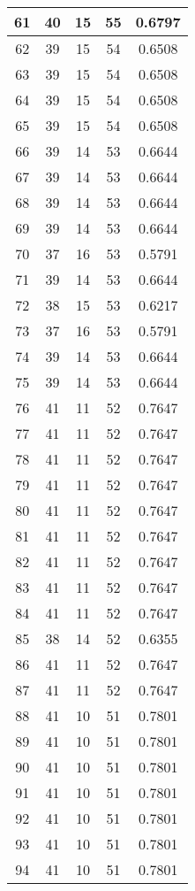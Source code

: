\documentclass[letterpaper, 12pt]{article}
\begin{document}
\begin{longtable}{|c|c|c|c|c|}
61 & 40 & 15 & 55 & 0.6797 \\
\hline
62 & 39 & 15 & 54 & 0.6508 \\
\hline
63 & 39 & 15 & 54 & 0.6508 \\
\hline
64 & 39 & 15 & 54 & 0.6508 \\
\hline
65 & 39 & 15 & 54 & 0.6508 \\
\hline
66 & 39 & 14 & 53 & 0.6644 \\
\hline
67 & 39 & 14 & 53 & 0.6644 \\
\hline
68 & 39 & 14 & 53 & 0.6644 \\
\hline
69 & 39 & 14 & 53 & 0.6644 \\
\hline
70 & 37 & 16 & 53 & 0.5791 \\
\hline
71 & 39 & 14 & 53 & 0.6644 \\
\hline
72 & 38 & 15 & 53 & 0.6217 \\
\hline
73 & 37 & 16 & 53 & 0.5791 \\
\hline
74 & 39 & 14 & 53 & 0.6644 \\
\hline
75 & 39 & 14 & 53 & 0.6644 \\
\hline
76 & 41 & 11 & 52 & 0.7647 \\
\hline
77 & 41 & 11 & 52 & 0.7647 \\
\hline
78 & 41 & 11 & 52 & 0.7647 \\
\hline
79 & 41 & 11 & 52 & 0.7647 \\
\hline
80 & 41 & 11 & 52 & 0.7647 \\
\hline
81 & 41 & 11 & 52 & 0.7647 \\
\hline
82 & 41 & 11 & 52 & 0.7647 \\
\hline
83 & 41 & 11 & 52 & 0.7647 \\
\hline
84 & 41 & 11 & 52 & 0.7647 \\
\hline
85 & 38 & 14 & 52 & 0.6355 \\
\hline
86 & 41 & 11 & 52 & 0.7647 \\
\hline
87 & 41 & 11 & 52 & 0.7647 \\
\hline
88 & 41 & 10 & 51 & 0.7801 \\
\hline
89 & 41 & 10 & 51 & 0.7801 \\
\hline
90 & 41 & 10 & 51 & 0.7801 \\
\hline
91 & 41 & 10 & 51 & 0.7801 \\
\hline
92 & 41 & 10 & 51 & 0.7801 \\
\hline
93 & 41 & 10 & 51 & 0.7801 \\
\hline
94 & 41 & 10 & 51 & 0.7801 \\

\end{longtable}
\end{document}
